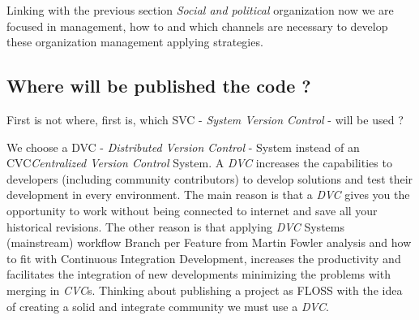 \documentclass[11pt]{scrartcl}
\begin{document}
\par Linking with the previous section \emph{Social and political} organization now we are focused in management, how to and which channels are necessary to develop these organization management applying strategies.

\subsection{Where will be published the code ?}
\label{sub:publish-code}

\par First is not where, first is, which SVC - \emph{System Version Control} - will be used ?

\par We choose a DVC - \emph{Distributed Version Control} - System instead of an CVC\emph{Centralized Version Control} System. A \emph{DVC} increases the capabilities to developers (including community contributors) to develop solutions and test their development in every environment. The main reason is that a \emph{DVC} gives you the opportunity to work without being connected to internet and save all your historical revisions. The other reason is that applying \emph{DVC} Systems (mainstream) workflow Branch per Feature from Martin Fowler analysis\cite{branch-per-feature} and how to fit with Continuous Integration Development, increases the productivity and facilitates the integration of new developments minimizing the problems with merging in \emph{CVC}s. Thinking about publishing a project as FLOSS with the idea of creating a solid and integrate community we must use a \emph{DVC}.
\end{document}
